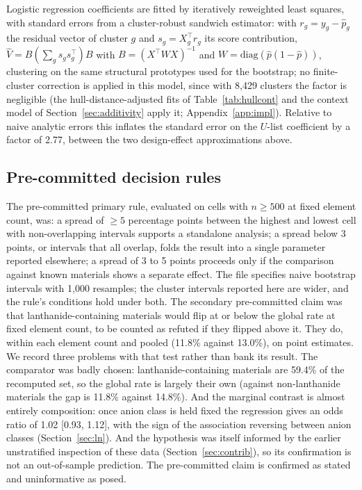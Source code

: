 \documentclass[11pt]{article}
\begin{document}
Logistic regression coefficients are fitted by iteratively reweighted least squares, with
standard errors from a cluster-robust sandwich estimator: with $r_g = y_g - \hat p_g$ the
residual vector of cluster $g$ and $s_g = X_g^{\top} r_g$ its score contribution,
$\hat V = B \left(\sum_g s_g s_g^{\top}\right) B$ with $B = (X^{\top} W X)^{-1}$ and
$W = \mathrm{diag}(\hat p(1-\hat p))$, clustering on the same structural prototypes used
for the bootstrap; no finite-cluster correction is applied in this model, since with 8{,}429 clusters
the factor is negligible (the hull-distance-adjusted fits of Table~\ref{tab:hullcont} and the
context model of Section~\ref{sec:additivity} apply it; Appendix~\ref{app:impl}). Relative to naive analytic errors this
inflates the standard error on the $U$-list coefficient by a factor of 2.77, between the
two design-effect approximations above.

\subsection{Pre-committed decision rules}\label{sec:prereg}

The pre-committed primary rule, evaluated on cells with $n \ge 500$ at fixed element
count, was: a spread of $\ge 5$ percentage points between the highest and lowest cell with
non-overlapping intervals supports a standalone analysis; a spread below 3 points, or
intervals that all overlap, folds the result into a single parameter reported elsewhere;
a spread of 3 to 5 points proceeds only if the comparison against known materials shows a
separate effect. The file specifies naive bootstrap intervals with 1{,}000 resamples; the
cluster intervals reported here are wider, and the rule's conditions hold under both. The
secondary pre-committed claim was that lanthanide-containing materials would flip at or
below the global rate at fixed element count, to be counted as refuted if they flipped
above it. They do, within each element count and pooled (11.8\% against 13.0\%), on point
estimates. We record three problems with that test rather than bank its result. The comparator was badly
chosen: lanthanide-containing materials are 59.4\% of the recomputed set, so the global
rate is largely their own (against non-lanthanide materials the gap is 11.8\% against
14.8\%). And the marginal contrast is almost entirely composition: once anion class is
held fixed the regression gives an odds ratio of 1.02 [0.93, 1.12], with the sign of
the association reversing between anion classes (Section~\ref{sec:ln}). And the
hypothesis was itself informed by the earlier unstratified inspection of these data
(Section~\ref{sec:contrib}), so its confirmation is not an out-of-sample prediction. The
pre-committed claim is confirmed as stated and uninformative as posed.
\end{document}
